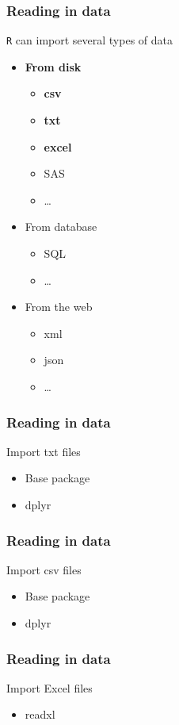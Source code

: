 \documentclass{beamer}
\begin{document}
\begin{frame}[fragile]
	\frametitle{Reading in data}
	\centering \Large \texttt{R} can import several types of data
	\begin{itemize}
		\small
		\item \textbf{From disk}
			\begin{itemize}
				\scriptsize
				\item \textbf{csv}
				\item \textbf{txt}
				\item \textbf{excel}
				\item SAS
				\item \ldots
				\small
			\end{itemize}
		\item From database
			\begin{itemize}
				\scriptsize
				\item SQL
				\item \ldots
				\small
			\end{itemize}
		\item From the web 
			\begin{itemize}
				\scriptsize
				\item xml
				\item json
				\item \ldots
				\small
			\end{itemize}
	\end{itemize}
\end{frame}



\begin{frame}[fragile]
	\frametitle{Reading in data}
	\centering \Large Import txt files
	\begin{itemize}
		\small
		\item Base package
		\item dplyr
	\end{itemize}
\end{frame}

\begin{frame}[fragile]
	\frametitle{Reading in data}
	\centering \Large Import csv files
	\begin{itemize}
		\small
		\item Base package
		\item dplyr
	\end{itemize}
\end{frame}

\begin{frame}[fragile]
	\frametitle{Reading in data}
	\centering \Large Import Excel files
	\begin{itemize}
		\small
		\item readxl
	\end{itemize}
\end{frame}
\end{document}
